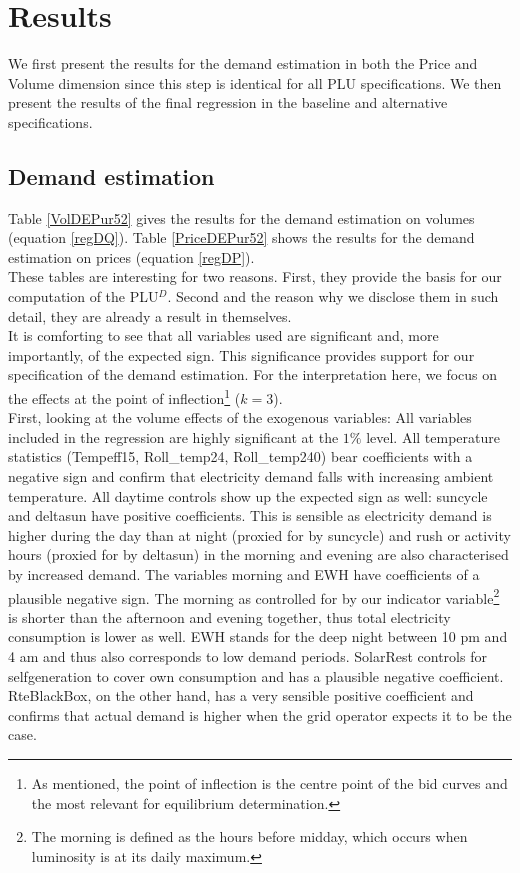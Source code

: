 \section{Results }
\label{resultsplusinterpret}
We first present the results for the demand estimation in both the Price and Volume dimension since this step is identical for all PLU specifications. We then present the results of the final regression in the baseline and alternative specifications. 

\subsection{Demand estimation}
Table \ref{VolDEPur52} gives the results for the demand estimation on volumes (equation \ref{regDQ}). Table \ref{PriceDEPur52} shows the results for the demand estimation on prices (equation \ref{regDP}). \\

These tables are interesting for two reasons. First, they provide the basis for our computation of the PLU$^D$. Second and the reason why we disclose them in such detail, they are already a result in themselves. \\

It is comforting to see that all variables used are significant and, more importantly, of the expected sign. This significance provides support for our specification of the demand estimation. For the interpretation here, we focus on the effects at the point of inflection\footnote{As mentioned, the point of inflection is the centre point of the bid curves and the most relevant for equilibrium determination. } ($k=3$). \\

First, looking at the volume effects of the exogenous variables: 
All variables included in the regression are highly significant at the $1\%$ level.
All temperature statistics (Tempeff15, Roll\_temp24, Roll\_temp240) bear coefficients with a negative sign and confirm that electricity demand falls with increasing ambient temperature. All daytime controls show up the expected sign as well: suncycle and deltasun have positive coefficients. This is sensible as electricity demand is higher during the day than at night (proxied for by suncycle) and rush or activity hours (proxied for by deltasun) in the morning and evening are also characterised by increased demand. The variables morning and EWH have coefficients of a plausible negative sign. The morning as controlled for by our indicator variable\footnote{The morning is defined as the hours before midday, which occurs when luminosity is at its daily maximum.} is shorter than the afternoon and evening together, thus total electricity consumption is lower as well. EWH stands for the deep night between 10 pm and 4 am and thus also corresponds to low demand periods. SolarRest controls for selfgeneration to cover own consumption and has a plausible negative coefficient. RteBlackBox, on the other hand, has a very sensible positive coefficient and confirms that actual demand is higher when the grid operator expects it to be the case. \\

